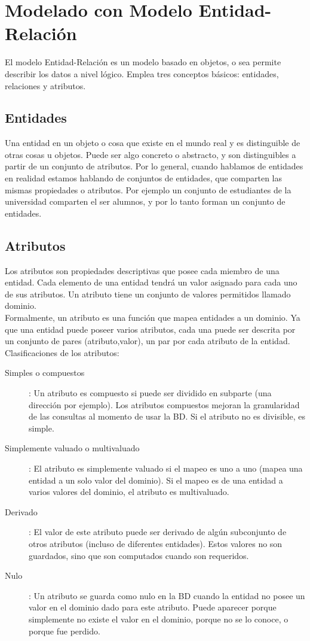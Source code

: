 \documentclass[a4paper]{article}
\begin{document}
\section{Modelado con Modelo Entidad-Relación}
El modelo Entidad-Relación es un modelo basado en objetos, o sea permite describir los datos a nivel
lógico. Emplea tres conceptos básicos: entidades, relaciones y atributos.

\subsection{Entidades}
Una entidad en un objeto o cosa que existe en el mundo real y es distinguible de otras cosas u
objetos. Puede ser algo concreto o abstracto, y son distinguibles a partir de un conjunto de
atributos. Por lo general, cuando hablamos de entidades en realidad estamos hablando de conjuntos
de entidades, que comparten las mismas propiedades o atributos. Por ejemplo un conjunto de
estudiantes de la universidad comparten el ser alumnos, y por lo tanto forman un conjunto de
entidades.

\subsection{Atributos}
Los atributos son propiedades descriptivas que posee cada miembro de una entidad. Cada elemento de
una entidad tendrá un valor asignado para cada uno de sus atributos. Un atributo tiene un conjunto
de valores permitidos llamado dominio. \\
Formalmente, un atributo es una función que mapea entidades a un dominio. Ya que una entidad puede
poseer varios atributos, cada una puede ser descrita por un conjunto de pares (atributo,valor), un
par por cada atributo de la entidad. \\
Clasificaciones de los atributos:
\begin{description}
    \item[Simples o compuestos]: Un atributo es compuesto si puede ser dividido en subparte (una
    dirección por ejemplo). Los atributos compuestos mejoran la granularidad de las consultas
    al momento de usar la BD. Si el atributo no es divisible, es simple.
    \item[Simplemente valuado o multivaluado]: El atributo es simplemente valuado si el mapeo es
    uno a uno (mapea una entidad a un solo valor del dominio). Si el mapeo es de una entidad a
    varios valores del dominio, el atributo es multivaluado.
    \item[Derivado]: El valor de este atributo puede ser derivado de algún subconjunto de otros
    atributos (incluso de diferentes entidades). Estos valores no son guardados, sino que son
    computados cuando son requeridos.
    \item[Nulo]: Un atributo se guarda como nulo en la BD cuando la entidad no posee un valor
    en el dominio dado para este atributo. Puede aparecer porque simplemente no existe el valor
    en el dominio, porque no se lo conoce, o porque fue perdido.
\end{description}
\end{document}
